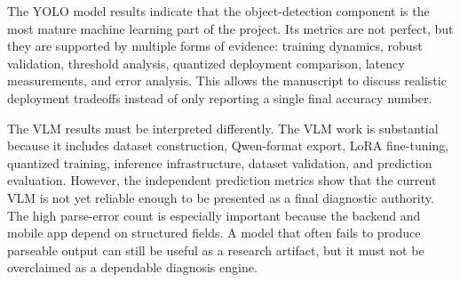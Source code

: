 \begin{table}[H]
\centering
\caption{Cross-system result synthesis}
\label{tab:cross-system-result-synthesis}
\small
{}
\end{table}


The YOLO model results indicate that the object-detection component is the most mature machine
learning part of the project. Its metrics are not perfect, but they are supported by multiple
forms of evidence: training dynamics, robust validation, threshold analysis, quantized deployment
comparison, latency measurements, and error analysis. This allows the manuscript to discuss
realistic deployment tradeoffs instead of only reporting a single final accuracy number.

The VLM results must be interpreted differently. The VLM work is substantial because it includes
dataset construction, Qwen-format export, LoRA fine-tuning, quantized training, inference
infrastructure, dataset validation, and prediction evaluation. However, the independent prediction
metrics show that the current VLM is not yet reliable enough to be presented as a final
diagnostic authority. The high parse-error count is especially important because the backend and
mobile app depend on structured fields. A model that often fails to produce parseable output can
still be useful as a research artifact, but it must not be overclaimed as a dependable diagnosis
engine.

